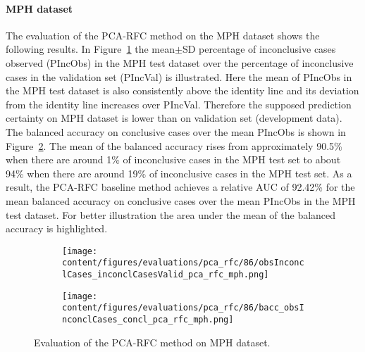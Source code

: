 
\paragraph{MPH dataset}

The evaluation of the PCA-RFC method on the MPH dataset shows the following results.
In Figure~\ref{fig:obsInconclCases_inconclCasesValid_pca_rfc_mph} 
the mean$\pm$SD percentage of inconclusive cases observed (PIncObs) in the MPH test dataset 
over the percentage of inconclusive cases in the validation set (PIncVal) is illustrated.
Here the mean of PIncObs in the MPH test dataset
is also consistently above the identity line and its deviation from the identity line increases over PIncVal.
Therefore the supposed prediction certainty on MPH dataset is lower than on validation set (development data).
The balanced accuracy on conclusive cases over the mean PIncObs is shown 
in Figure~\ref{fig:bacc_obsInconclCases_concl_pca_rfc_mph}.
The mean of the balanced accuracy rises from approximately 90.5\% 
when there are around 1\% of inconclusive cases in the MPH test set to about 94\% 
when there are around 19\% of inconclusive cases in the MPH test set.
As a result, the PCA-RFC baseline method achieves a relative AUC of 92.42\% for the mean balanced accuracy on conclusive cases 
over the mean PIncObs in the MPH test dataset.
For better illustration the area under the mean of the balanced accuracy is highlighted.


\begin{figure}[ht]
  \begin{subfigure}{0.9\textwidth}
    \centering
    \texttt{[image: content/figures/evaluations/pca\_rfc/86/obsInconclCases\_inconclCasesValid\_pca\_rfc\_mph.png]}
    \label{fig:obsInconclCases_inconclCasesValid_pca_rfc_mph}
  \end{subfigure}
  \hfill
  \begin{subfigure}{0.9\textwidth}
    \centering
    \texttt{[image: content/figures/evaluations/pca\_rfc/86/bacc\_obsInconclCases\_concl\_pca\_rfc\_mph.png]}
    \label{fig:bacc_obsInconclCases_concl_pca_rfc_mph}
  \end{subfigure}
  \caption{Evaluation of the PCA-RFC method on MPH dataset.}
  \label{fig:perf_results_rfc_mph}
\end{figure}



